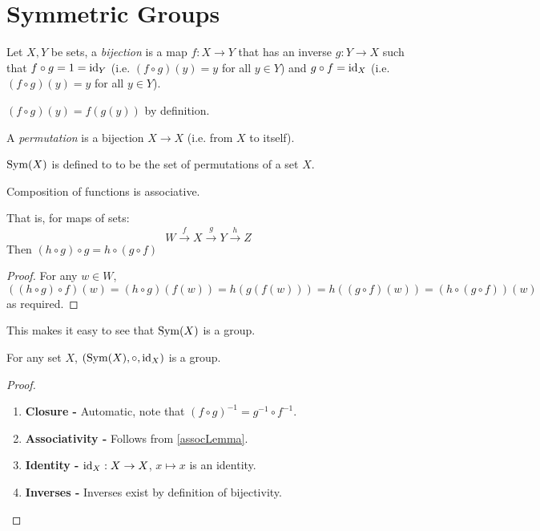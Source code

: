 \documentclass[../main.tex]{subfiles}
\begin{document}
\section{Symmetric Groups}
\begin{definition}[Bijection]
  Let $X, Y$ be sets, a \textit{bijection} is a map $f: X \to Y$ that has an inverse $g: Y \to X$ such that $f \circ g = 1=\mathrm{id}_Y$ (i.e. $(f \circ g)(y) = y$ for all $y \in Y$) and $g \circ f = \mathrm{id}_X$ (i.e. $(f \circ g)(y) = y$ for all $y \in Y$).
\end{definition}
\begin{remark}[Notation]
  $(f \circ g)(y) = f(g(y))$ by definition.
\end{remark}
\begin{definition}[Permutation]
  A \textit{permutation} is a bijection $X \to X$ (i.e. from $X$ to itself).
\end{definition}
\begin{definition}
  $\operatorname{Sym}(X)$ is defined to to be the set of permutations of a set $X$.
\end{definition}
\begin{lemma}
  Composition of functions is associative.

  That is, for maps of sets:
  \[
    W \xrightarrow{f} X \xrightarrow{g} Y \xrightarrow{h} Z
  \]
  Then $(h \circ g) \circ g = h \circ (g \circ f)$
  \label{assocLemma}
\end{lemma}
\begin{proof}
For any $w \in W$,
  \[
    ((h \circ g) \circ f)(w) = (h \circ g)(f(w)) = h(g(f(w))) = h((g \circ f)(w)) = (h \circ (g \circ f))(w)
  \]
  as required.
\end{proof}
This makes it easy to see that $\operatorname{Sym}(X)$ is a group.
\begin{proposition}
  For any set $X$, $(\operatorname{Sym}(X), \circ, \mathrm{id}_X)$ is a group.
\end{proposition}
\begin{proof}
  \begin{enumerate}
    \item \textbf{Closure -} Automatic, note that $(f \circ g)^{-1} = g^{-1} \circ f^{-1}$.
    \item \textbf{Associativity -} Follows from \cref{assocLemma}.
    \item \textbf{Identity -} $\mathrm{id}_X: X \to X$, $x \mapsto x$ is an identity.
    \item \textbf{Inverses -} Inverses exist by definition of bijectivity.
  \end{enumerate}
\end{proof}
\end{document}
